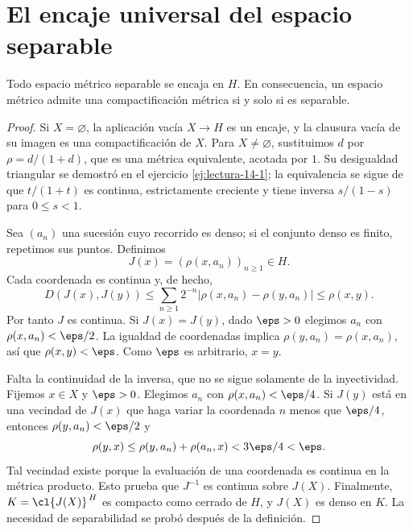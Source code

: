 \section{El encaje universal del espacio separable}
\begin{teorema}\label{ch16:encaje}
Todo espacio métrico separable se encaja en $H$. En consecuencia, un espacio métrico admite una compactificación métrica si y solo si es separable.
\end{teorema}
\begin{proof}
Si $X=\varnothing$, la aplicación vacía $X\to H$ es un encaje, y la clausura vacía de su imagen es una compactificación de $X$. Para $X\ne\varnothing$, sustituimos $d$ por $\rho=d/(1+d)$, que es una métrica equivalente, acotada por $1$. Su desigualdad triangular se demostró en el ejercicio \ref{ej:lectura-14-1}; la equivalencia se sigue de que $t/(1+t)$ es continua, estrictamente creciente y tiene inversa $s/(1-s)$ para $0\le s<1$.

Sea $(a_n)$ una sucesión cuyo recorrido es denso; si el conjunto denso es finito, repetimos sus puntos. Definimos
\[
J(x)=(\rho(x,a_n))_{n\ge1}\in H.
\]
Cada coordenada es continua y, de hecho,
\[
D(J(x),J(y))\le\sum_{n\ge1}2^{-n}|\rho(x,a_n)-\rho(y,a_n)|\le\rho(x,y).
\]
Por tanto $J$ es continua. Si $J(x)=J(y)$, dado $\eps>0$ elegimos $a_n$ con $\rho(x,a_n)<\eps/2$. La igualdad de coordenadas implica $\rho(y,a_n)=\rho(x,a_n)$, así que $\rho(x,y)<\eps$. Como $\eps$ es arbitrario, $x=y$.

Falta la continuidad de la inversa, que no se sigue solamente de la inyectividad. Fijemos $x\in X$ y $\eps>0$. Elegimos $a_n$ con $\rho(x,a_n)<\eps/4$. Si $J(y)$ está en una vecindad de $J(x)$ que haga variar la coordenada $n$ menos que $\eps/4$, entonces $\rho(y,a_n)<\eps/2$ y
\[
\rho(y,x)\le\rho(y,a_n)+\rho(a_n,x)<3\eps/4<\eps.
\]
Tal vecindad existe porque la evaluación de una coordenada es continua en la métrica producto. Esto prueba que $J^{-1}$ es continua sobre $J(X)$. Finalmente, $K=\cl{J(X)}^{\,H}$ es compacto como cerrado de $H$, y $J(X)$ es denso en $K$. La necesidad de separabilidad se probó después de la definición.
\end{proof}

